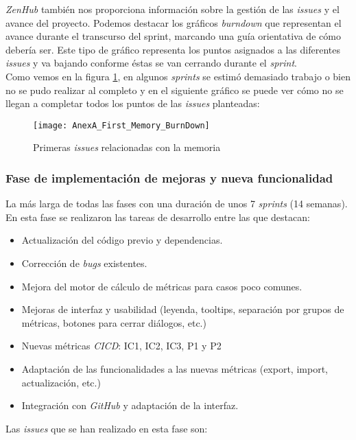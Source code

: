 \textit{ZenHub} también nos proporciona información sobre la gestión de las \textit{issues} y el avance del proyecto. Podemos destacar los gráficos \textit{burndown} que representan el avance durante el transcurso del sprint, marcando una guía orientativa de cómo debería ser. Este tipo de gráfico representa los puntos asignados a las diferentes \textit{issues} y va bajando conforme éstas se van cerrando durante el \textit{sprint}. \\
Como vemos en la figura \ref{fig:AnexA_First_Memory_BurnDown}, en algunos \textit{sprints} se estimó demasiado trabajo o bien no se pudo realizar al completo y en el siguiente gráfico se puede ver cómo no se llegan a completar todos los puntos de las \textit{issues} planteadas:

\begin{figure}[!h]
	\centering
	\texttt{[image: AnexA\_First\_Memory\_BurnDown]}
	\caption{Primeras \textit{issues} relacionadas con la memoria}
	\label{fig:AnexA_First_Memory_BurnDown}
\end{figure}
\FloatBarrier

\subsubsection{Fase de implementación de mejoras y nueva funcionalidad}
La más larga de todas las fases con una duración de unos 7 \textit{sprints} (14 semanas). En esta fase se realizaron las tareas de desarrollo entre las que destacan:

\begin{itemize}
	\item Actualización del código previo y dependencias.
	\item Corrección de \textit{bugs}  existentes.
	\item Mejora del motor de cálculo de métricas para casos poco comunes.
	\item Mejoras de interfaz y usabilidad (leyenda, tooltips, separación por grupos de métricas, botones para cerrar diálogos, etc.)
	\item Nuevas métricas \textit{CICD}: IC1, IC2, IC3, P1 y P2
	\item Adaptación de las funcionalidades a las nuevas métricas (export, import, actualización, etc.)
	\item Integración con \textit{GitHub} y adaptación de la interfaz.
\end{itemize}

Las \textit{issues} que se han realizado en esta fase son:

